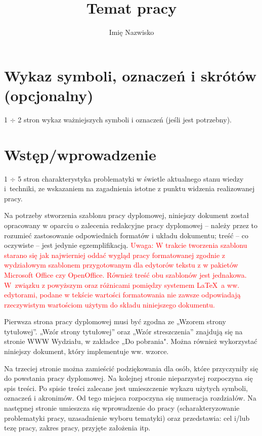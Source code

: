 \documentclass[12pt,twoside]{mwart}
\author{Imię Nazwisko}
\title{Temat pracy}
\begin{document}
\maketitle

\blankpage

\tableofcontents

\clearpage
\blankpage


\section*{Wykaz symboli, oznaczeń i skrótów (opcjonalny)}
%

1 $\div$ 2 stron wykaz ważniejszych symboli i oznaczeń (jeśli jest potrzebny).
\clearpage

\section{Wstęp/wprowadzenie}
1 $\div$ 5 stron charakterystyka problematyki w świetle aktualnego stanu wiedzy i~techniki, ze wskazaniem na zagadnienia istotne z punktu widzenia realizowanej pracy.

Na potrzeby stworzenia szablonu pracy dyplomowej, niniejszy dokument został opracowany w oparciu o zalecenia redakcyjne pracy dyplomowej -- należy przez to rozumieć zastosowanie odpowiednich formatów i układu dokumentu; treść -- co oczywiste -- jest jedynie egzemplifikacją. 
\textcolor{red}{
Uwaga: 
W trakcie tworzenia szablonu starano się jak najwierniej oddać wygląd pracy formatowanej zgodnie z wydziałowym szablonem przygotowanym dla edytorów tekstu z w pakietów Microsoft Office czy OpenOffice. Również treść obu szablonów jest jednakowa. W~związku z powyższym oraz różnicami pomiędzy systemem \LaTeX \ a ww. edytorami, podane w tekście wartości formatowania nie zawsze odpowiadają rzeczywistym wartościom użytym do składu niniejszego dokumentu.
}

Pierwsza strona pracy dyplomowej musi być zgodna ze „Wzorem strony tytułowej”. „Wzór strony tytułowej” oraz „Wzór streszczenia” znajdują się na stronie WWW Wydziału, w zakładce „Do pobrania". Można również wykorzystać niniejszy dokument, który implementuje ww. wzorce.

Na trzeciej stronie można zamieścić podziękowania dla osób, które przyczyniły się do powstania pracy dyplomowej. Na kolejnej stronie nieparzystej rozpoczyna się spis treści. Po spisie treści zalecane jest umieszczenie wykazu użytych symboli, oznaczeń i akronimów. Od tego miejsca rozpoczyna się numeracja rozdziałów. Na następnej stronie umieszcza się wprowadzenie do pracy (scharakteryzowanie problematyki pracy, uzasadnienie wyboru tematyki) oraz przedstawia: cel i/lub tezę pracy, zakres pracy, przyjęte założenia itp.
\end{document}
